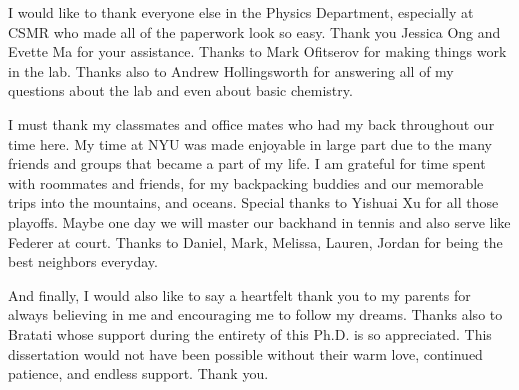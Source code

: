 I would like to thank everyone else in the Physics Department, especially at CSMR who made all of the paperwork look so easy. Thank you Jessica Ong and Evette Ma for your assistance. Thanks to Mark Ofitserov for making things work in the lab. Thanks also to Andrew Hollingsworth for answering all of my questions about the lab and even about basic chemistry.

I must thank my classmates and office mates who had my back throughout our time here. My time at NYU was made enjoyable in large part due to the many friends and groups that became a part of my life. I am grateful for time spent with roommates and friends, for my backpacking buddies and our memorable trips into the mountains, and oceans. Special thanks to Yishuai Xu for all those playoffs. Maybe one day we will master our backhand in tennis and also serve like Federer at court. Thanks to Daniel, Mark, Melissa, Lauren, Jordan for being the best neighbors everyday.

And finally, I would also like to say a heartfelt thank you to my parents for always believing in me and encouraging me to follow my dreams. Thanks also to Bratati whose support during the entirety of this Ph.D. is so appreciated. This dissertation would not have been possible without their warm love, continued patience, and endless support. Thank you.

